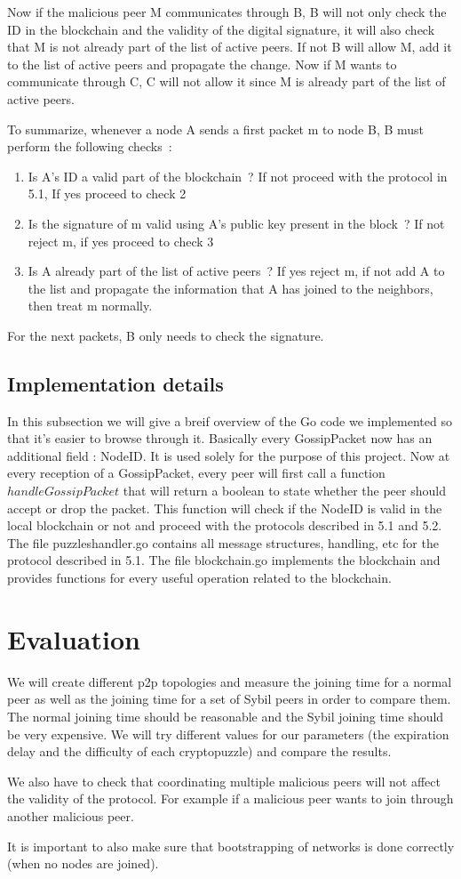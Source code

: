 \documentclass[twocolumn]{article}
\begin{document}
Now if the malicious peer M communicates through B, B will not only check the ID in the blockchain and the validity of the digital signature, it will also check that M is not already part of the list of active peers. If not B will allow M, add it to the list of active peers and propagate the change. Now if M wants to communicate through C, C  will not allow it since M is already part of the list of active peers.

To summarize, whenever a node A sends a first packet m to node B, B must perform the following checks :
\begin{enumerate}
	\item Is A’s ID  a valid part of the blockchain ? If not proceed with the protocol in 5.1, If yes proceed to check 2
	\item Is the signature of m valid using A’s public key present in the block ? If not reject m, if yes proceed to check 3
	\item Is A already part of the list of active peers ? If yes reject m, if not add A to the list and propagate the information that A has joined to the neighbors, then treat m normally.
\end{enumerate}


For the next packets, B only needs to check the signature.

\subsection{Implementation details}
In this subsection we will give a breif overview of the Go code we implemented so that it's easier to browse through it. Basically every GossipPacket now has an additional field : NodeID. It is used solely for the purpose of this project. Now at every reception of a GossipPacket, every peer will first call a function $handleGossipPacket$ that will return a boolean to state whether the peer should accept or drop the packet. This function will check if the NodeID is valid in the local blockchain or not and proceed with the protocols described in 5.1 and 5.2. The file puzzleshandler.go contains all message structures, handling, etc for the protocol described in 5.1. The file blockchain.go implements the blockchain and provides functions for every useful operation related to the blockchain.

\section{Evaluation}
We will create different p2p topologies and measure the joining time for a normal peer as well as the joining time for a set of Sybil peers in order to compare them. The normal joining time should be reasonable and the Sybil joining time should be very expensive. We will try different values for our parameters (the expiration delay and the difficulty of each cryptopuzzle) and compare the results.

We also have to check that coordinating multiple malicious peers will not affect the validity of the protocol. For example if a malicious peer wants to join through another malicious peer.

It is important to also make sure that bootstrapping of networks is done correctly (when no nodes are joined).
\printbibliography
\end{document}
